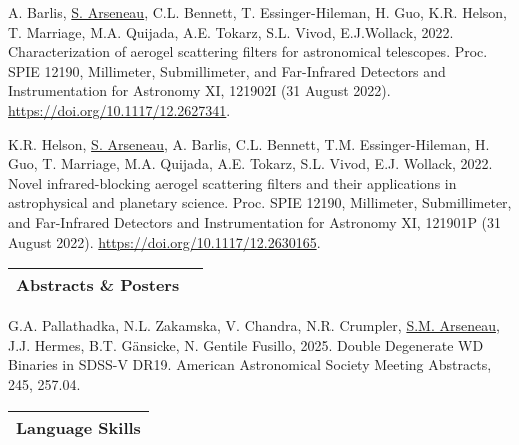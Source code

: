 \documentclass[letterpaper,11pt]{article}
\newenvironment{packed_enumerate}[1][]{
\begin{etaremune}[#1]
  \setlength{\itemsep}{3.7pt}
  \setlength{\parskip}{0pt}
  \setlength{\parsep}{0pt}}{\end{etaremune}
}
\begin{document}
\begin{packed_enumerate}
\item A. Barlis, \underline{S. Arseneau}, C.L. Bennett, T. Essinger-Hileman, H. Guo, K.R. Helson, T. Marriage, M.A. Quijada, A.E. Tokarz, S.L. Vivod, E.J.Wollack, 2022. Characterization of aerogel scattering filters for astronomical telescopes. Proc. SPIE 12190, Millimeter, Submillimeter, and Far-Infrared Detectors and Instrumentation for Astronomy XI, 121902I (31 August 2022). \href{https://doi.org/10.1117/12.2627341}{https://doi.org/10.1117/12.2627341}.

\item K.R. Helson, \underline{S. Arseneau}, A. Barlis, C.L. Bennett, T.M. Essinger-Hileman, H. Guo, T. Marriage, M.A. Quijada, A.E. Tokarz, S.L. Vivod, E.J. Wollack, 2022. Novel infrared-blocking aerogel scattering filters and their applications in astrophysical and planetary science. Proc. SPIE 12190, Millimeter, Submillimeter, and Far-Infrared Detectors and Instrumentation for Astronomy XI, 121901P (31 August 2022). \href{https://doi.org/10.1117/12.2630165}{https://doi.org/10.1117/12.2630165}.

\end{packed_enumerate}
\vspace{2.0mm}

\noindent
\begin{tabular*}{\textwidth}{l@{\extracolsep{\fill}}r}
\large {\sc \Large{Abstracts \& Posters}}  \\
\hline
\end{tabular*}\vspace{3.5mm}

\noindent

\begin{packed_enumerate}

\item G.A. Pallathadka, N.L. Zakamska, V. Chandra, N.R. Crumpler, \underline{S.M. Arseneau}, J.J. Hermes, B.T. G\"ansicke, N. Gentile Fusillo, 2025. Double Degenerate WD Binaries in SDSS-V DR19. American Astronomical Society Meeting Abstracts, 245, 257.04.

\end{packed_enumerate}
\vspace{2.0mm}


\noindent
\begin{tabular*}{\textwidth}{l@{\extracolsep{\fill}}}
\large {\sc \Large{Language Skills}}\\
\hline
\end{tabular*}\vspace{1.mm}
\end{document}
